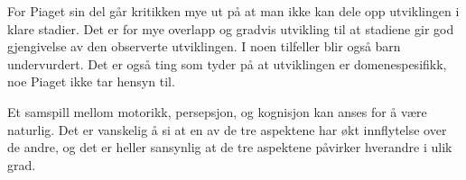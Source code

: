 \documentclass[12pt, a4paper]{article}
\begin{document}
For Piaget sin del går kritikken mye ut på at man ikke kan dele opp utviklingen
i klare stadier. Det er for mye overlapp og gradvis utvikling til at stadiene
gir god gjengivelse av den observerte utviklingen. I noen tilfeller blir også
barn undervurdert. Det er også ting som tyder på at utviklingen er
domenespesifikk, noe Piaget ikke tar hensyn til.  

Et samspill mellom motorikk, persepsjon, og kognisjon kan anses for å være
naturlig. Det er vanskelig å si at en av de tre aspektene har økt innflytelse
over de andre, og det er heller sansynlig at de tre aspektene påvirker
hverandre i ulik grad.  



%
%
%
%
%
%
%
%
%
\end{document}

